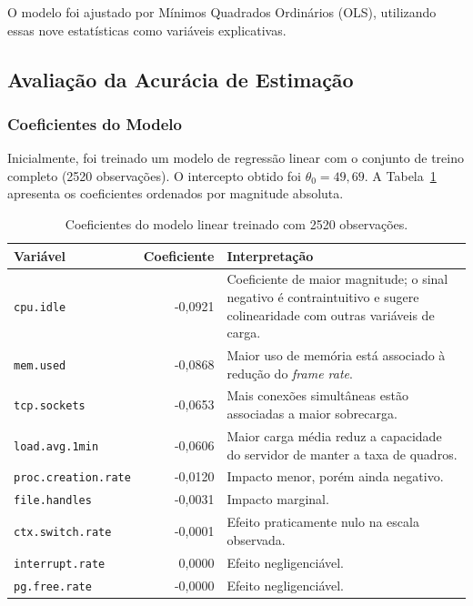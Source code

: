 \documentclass[11pt,a4paper]{article}
\begin{document}
O modelo foi ajustado por Mínimos Quadrados Ordinários (OLS), utilizando essas nove estatísticas como variáveis explicativas.

\subsection{Avaliação da Acurácia de Estimação}

\subsubsection{Coeficientes do Modelo}

Inicialmente, foi treinado um modelo de regressão linear com o conjunto de treino completo (2520 observações). O intercepto obtido foi \(\theta_0=49,69\). A Tabela~\ref{tab:coef-linear-principal} apresenta os coeficientes ordenados por magnitude absoluta.

\begin{table}[H]
\centering
\caption{Coeficientes do modelo linear treinado com 2520 observações.}
\label{tab:coef-linear-principal}
\begin{tabular}{lrp{8cm}}
\toprule
Variável & Coeficiente & Interpretação \\
\midrule
\texttt{cpu.idle} & -0,0921 & Coeficiente de maior magnitude; o sinal negativo é contraintuitivo e sugere colinearidade com outras variáveis de carga. \\
\texttt{mem.used} & -0,0868 & Maior uso de memória está associado à redução do \textit{frame rate}. \\
\texttt{tcp.sockets} & -0,0653 & Mais conexões simultâneas estão associadas a maior sobrecarga. \\
\texttt{load.avg.1min} & -0,0606 & Maior carga média reduz a capacidade do servidor de manter a taxa de quadros. \\
\texttt{proc.creation.rate} & -0,0120 & Impacto menor, porém ainda negativo. \\
\texttt{file.handles} & -0,0031 & Impacto marginal. \\
\texttt{ctx.switch.rate} & -0,0001 & Efeito praticamente nulo na escala observada. \\
\texttt{interrupt.rate} & 0,0000 & Efeito negligenciável. \\
\texttt{pg.free.rate} & -0,0000 & Efeito negligenciável. \\
\bottomrule
\end{tabular}
\end{table}
\end{document}
